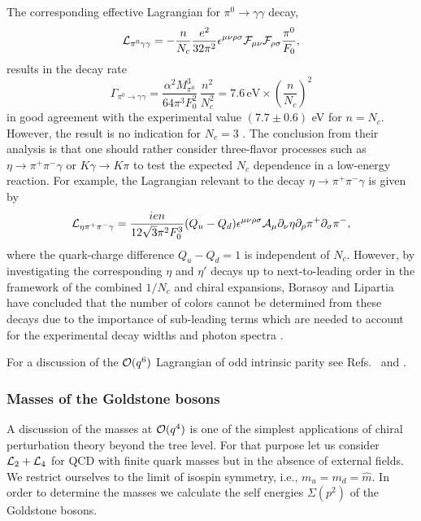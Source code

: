 \documentclass[twoside,12pt]{article}
\begin{document}
   The corresponding effective Lagrangian for $\pi^0\to\gamma\gamma$ decay,
\begin{displaymath}
{\cal L}_{\pi^0\gamma\gamma}=-\frac{n}{N_c}
\frac{e^2}{32\pi^2}\epsilon^{\mu\nu \rho\sigma}{\cal
F}_{\mu\nu}{\cal F}_{\rho\sigma}\frac{\pi^0}{F_0},
\end{displaymath}
results in the decay rate
\begin{displaymath}
\Gamma_{\pi^0\to\gamma\gamma}= \frac{\alpha^2 M^3_{\pi^0}}{64 \pi^3
F^2_0}\,\frac{n^2}{N_c^2}
=7.6\,\mbox{eV}\times\left(\frac{n}{N_c}\right)^2
\end{displaymath}
   in good agreement with the experimental value
$(7.7\pm 0.6)$ eV for $n=N_c$.
   However, the result is no indication for $N_c=3$ \cite{Bar:2001qk}.
   The conclusion from their analysis is that one should rather consider
three-flavor processes such as $\eta\to\pi^+\pi^-\gamma$ or
$K\gamma\to K\pi$ to test the expected $N_c$ dependence in a low-energy reaction.
   For example, the Lagrangian relevant to the decay
$\eta\to\pi^+\pi^-\gamma$ is given by
\begin{displaymath}
{\cal L}_{\eta\pi^+\pi^-\gamma}=\frac{ien}{12\sqrt{3}\pi^2 F_0^3}(Q_u-Q_d)
\epsilon^{\mu\nu\rho\sigma}{\cal A}_\mu\partial_\nu\eta\partial_\rho\pi^+
\partial_\sigma\pi^-,
\end{displaymath}
where the quark-charge difference $Q_u-Q_d=1$ is independent of $N_c$.
   However, by investigating the corresponding $\eta$ and $\eta'$
decays up to next-to-leading order in the framework of the combined $1/N_c$ and
chiral expansions, Borasoy and Lipartia have concluded that the number of
colors cannot be determined from these decays due to the importance of
sub-leading terms which are needed to account for the experimental decay
widths and photon spectra \cite{Borasoy:2004mf}.

   For a discussion of the ${\cal O}(q^6)$ Lagrangian of odd intrinsic parity
see Refs.\ \cite{Ebertshauser:2001nj} and \cite{Bijnens:2001bb}.

\subsubsection{Masses of the Goldstone bosons}
\label{sec_aop4}
   A discussion of the masses at ${\cal O}(q^4)$ is one of the simplest applications
of chiral perturbation theory beyond the tree level.
   For that purpose let us consider ${\cal L}_2 + {\cal L}_4$ for QCD with finite quark
masses but in the absence of external fields.
   We restrict ourselves to the limit of isospin symmetry, i.e.,
$m_u=m_d=\hat m$.
   In order to determine the masses we calculate the self energies
$\Sigma(p^2)$ of the Goldstone bosons.
\end{document}
